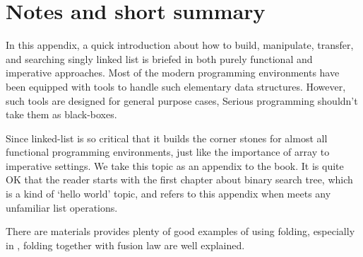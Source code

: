 \documentclass[b5paper]{article}
\begin{document}
\section{Notes and short summary}
In this appendix, a quick introduction about how to build, manipulate, transfer, and searching singly
linked list is briefed in both purely functional and imperative approaches. Most of the modern programming
environments have been equipped with tools to handle such elementary data structures. However, such tools
are designed for general purpose cases, Serious programming shouldn't take them as black-boxes.

Since linked-list is so critical that it builds the corner stones for almost all functional programming
environments, just like the importance of array to imperative settings. We take this topic as an appendix
to the book. It is quite OK that the reader starts with the first chapter about binary search tree, which
is a kind of `hello world' topic, and refers to this appendix when meets any unfamiliar list operations.

There are materials provides plenty of good examples of using folding, especially in \cite{fp-pearls},
folding together with fusion law are well explained.
\end{document}
